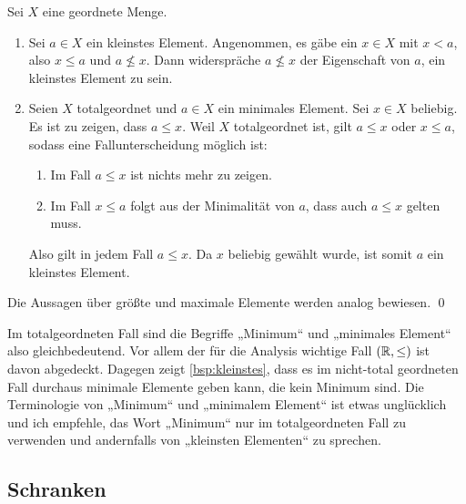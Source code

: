 \begin{bew}
    Sei $X$ eine geordnete Menge.
    \begin{enumerate}
        \item Sei $a\in X$ ein kleinstes Element. Angenommen, es gäbe ein $x\in X$ mit $x<a$, also $x\le a$ und $a\not\le x$. Dann widerspräche $a\not\le x$ der Eigenschaft von $a$, ein kleinstes Element zu sein.
        \item Seien $X$ totalgeordnet und $a\in X$ ein minimales Element. Sei $x\in X$ beliebig. Es ist zu zeigen, dass $a\le x$. Weil $X$ totalgeordnet ist, gilt $a\le x$ oder $x\le a$, sodass eine Fallunterscheidung möglich ist:
        \begin{enumerate}[1.]
            \item Im Fall $a\le x$ ist nichts mehr zu zeigen.
            \item Im Fall $x\le a$ folgt aus der Minimalität von $a$, dass auch $a\le x$ gelten muss.
        \end{enumerate}
        Also gilt in jedem Fall $a\le x$. Da $x$ beliebig gewählt wurde, ist somit $a$ ein kleinstes Element.
    \end{enumerate}
    Die Aussagen über größte und maximale Elemente werden analog bewiesen. \qed
\end{bew}


\begin{bem}
    Im totalgeordneten Fall sind die Begriffe „Minimum“ und „minimales Element“ also gleichbedeutend. Vor allem der für die Analysis wichtige Fall $(\mathbb R,\le)$ ist davon abgedeckt. Dagegen zeigt \cref{bsp:kleinstes}, dass es im nicht-total geordneten Fall durchaus minimale Elemente geben kann, die kein Minimum sind. Die Terminologie von „Minimum“ und „minimalem Element“ ist etwas unglücklich und ich empfehle, das Wort „Minimum“ nur im totalgeordneten Fall zu verwenden und andernfalls von „kleinsten Elementen“ zu sprechen.
\end{bem}


\subsection*{Schranken}


